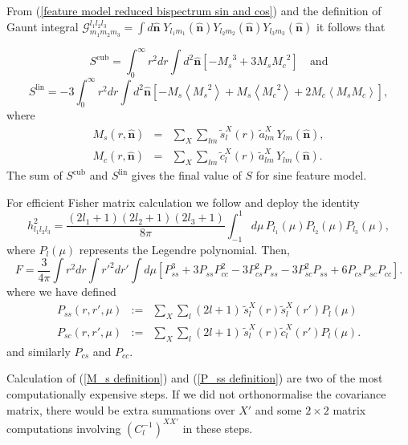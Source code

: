From (\ref{feature model reduced bispectrum sin and cos}) and the definition of Gaunt integral $\mathcal{G}^{l_1 l_2 l_3}_{m_1 m_2 m_3} = \int d\hat{\mathbf{n}} \; Y_{l_1 m_1}(\hat{\mathbf{n}}) Y_{l_2 m_2}(\hat{\mathbf{n}}) Y_{l_3 m_3}(\hat{\mathbf{n}})$ it follows that

\begin{equation}
	S^\text{cub} = \int_0^\infty r^2 dr \int d^2\hat{\mathbf{n}} \left[ - {M_s}^3 + 3 M_s {M_c}^2 \right] \quad\text{and}
\end{equation}
\begin{equation}
	S^\text{lin} = -3 \int_0^\infty r^2 dr \int d^2\hat{\mathbf{n}} \left[ - {M_s} \left<{M_s}^2\right> + M_s \left< {M_c}^2 \right> + 2 {M_c} \left< {M_s} {M_c} \right> \right],
\end{equation}
where
\begin{eqnarray}
	M_s(r, \hat{\mathbf{n}}) &=& \sum_X \sum_{l m} \tilde{s}_l^X(r) \, \tilde{a}_{lm}^X \, Y_{lm}(\hat{\mathbf{n}}), \nonumber\\
	M_c(r, \hat{\mathbf{n}}) &=& \sum_X \sum_{l m} \tilde{c}_l^X(r) \, \tilde{a}_{lm}^X \, Y_{lm}(\hat{\mathbf{n}}).
	\label{M_s definition}
\end{eqnarray}
The sum of $S^\text{cub}$ and $S^\text{lin}$ gives the final value of $S$ for sine feature model.

For efficient Fisher matrix calculation we follow \cite{Smith2011} and deploy the identity
\begin{equation}
	h_{l_1 l_2 l_3} ^2 = \frac{(2l_1 +1)(2l_2 +1)(2l_3 +1)}{8\pi} \int_{-1}^{1} d\mu \, P_{l_1}(\mu)P_{l_2}(\mu)P_{l_3}(\mu), \label{h}
\end{equation}
where $P_{l}(\mu)$ represents the Legendre polynomial. Then,
\begin{equation}
	F = \frac{3}{4\pi} \int r^2 dr \int r'^2 dr' \int d\mu \left[ P_{ss}^3 + 3 P_{ss} P_{cc}^2 - 3 P_{cs}^2 P_{ss} - 3 P_{sc}^2 P_{ss} + 6 P_{cs}P_{sc}P_{cc} \right].
\end{equation}
where we have defined
\begin{eqnarray}
	P_{ss}(r, r', \mu) &:=& \sum_{X} \sum_{l} (2l+1) \, \tilde{s}_l^X(r) \tilde{s}_l^X(r') P_l(\mu) \nonumber \\
	P_{sc}(r, r', \mu) &:=& \sum_{X} \sum_{l} (2l+1) \, \tilde{s}_l^X(r) \tilde{c}_l^X(r') P_l(\mu).
	\label{P_ss definition}
\end{eqnarray}
and similarly $P_{cs}$ and $P_{cc}$.

Calculation of (\ref{M_s definition}) and (\ref{P_ss definition}) are two of the most computationally expensive steps. If we did not orthonormalise the covariance matrix, there would be extra summations over $X'$ and some $2\times2$ matrix computations involving $(C_l^{-1})^{XX'}$ in these steps.


